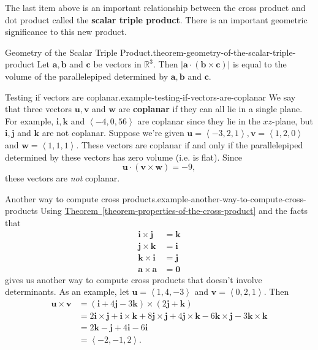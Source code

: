 \documentclass[10pt,]{book}
\newcommand{\terminology}[1]{\textbf{#1}}
\numberwithin{equation}{section}
\newcommand{\RR}{\mathbb{R}}
\newcommand{\vv}[1]{\mathbf{#1}}
\newcommand{\dotprod}[1]{\left\langle #1 \right\rangle}
\begin{document}
\hypertarget{p-1185}{}%
The last item above is an important relationship between the cross product and dot product called the \terminology{scalar triple product}. There is an important geometric significance to this new product.%
\begin{theorem}{Geometry of the Scalar Triple Product.}{}{theorem-geometry-of-the-scalar-triple-product}%
\hypertarget{p-1186}{}%
Let \(\vv{a},\vv{b}\) and \(\vv{c}\) be vectors in \(\RR^{3}\). Then \(|\vv{a}\cdot(\vv{b}\times\vv{c})|\) is equal to the volume of the parallelepiped determined by \(\vv{a},\vv{b}\) and \(\vv{c}\).%
\end{theorem}
\begin{example}{Testing if vectors are coplanar.}{example-testing-if-vectors-are-coplanar}%
\hypertarget{p-1187}{}%
We say that three vectors \(\vv{u},\vv{v}\) and \(\vv{w}\) are \terminology{coplanar} if they can all lie in a single plane. For example, \(\vv{i},\vv{k}\) and \(\dotprod{-4,0,56}\) are coplanar since they lie in the \(xz\)-plane, but \(\vv{i},\vv{j}\) and \(\vv{k}\) are not coplanar. Suppose we're given \(\vv{u} = \dotprod{-3,2,1},\vv{v} = \dotprod{1,2,0}\) and \(\vv{w} = \dotprod{1,1,1}\). These vectors are coplanar if and only if the parallelepiped determined by these vectors has zero volume (i.e. is flat). Since%
%
\begin{equation*}
\vv{u}\cdot(\vv{v}\times\vv{w}) = -9,
\end{equation*}
\hypertarget{p-1188}{}%
these vectors are \emph{not} coplanar.%
\end{example}
\begin{example}{Another way to compute cross products.}{example-another-way-to-compute-cross-products}%
\hypertarget{p-1189}{}%
Using \hyperref[theorem-properties-of-the-cross-product]{Theorem~\ref{theorem-properties-of-the-cross-product}} and the facts that%
%
\begin{align*}
\vv{i}\times\vv{j} & = \vv{k} \\
\vv{j}\times\vv{k} & = \vv{i} \\
\vv{k}\times\vv{i} & = \vv{j} \\
\vv{a}\times\vv{a} & = \vv{0} 
\end{align*}
\hypertarget{p-1190}{}%
gives us another way to compute cross products that doesn't involve determinants. As an example, let \(\vv{u} = \dotprod{1,4,-3}\) and \(\vv{v} = \dotprod{0,2,1}.\) Then%
%
\begin{align*}
\vv{u}\times\vv{v} & = (\vv{i}+4\vv{j}-3\vv{k})\times(2\vv{j}+\vv{k}) \\
& = 2\vv{i}\times\vv{j} + \vv{i}\times\vv{k} +8\vv{j}\times\vv{j} + 4\vv{j}\times\vv{k} - 6\vv{k}\times\vv{j} -3\vv{k}\times\vv{k} \\
& = 2\vv{k}-\vv{j}+4\vv{i}-6\vv{i} \\
& = \dotprod{-2,-1,2}. 
\end{align*}
\end{example}
%
%
\typeout{************************************************}
\typeout{************************************************}
%
\end{document}
